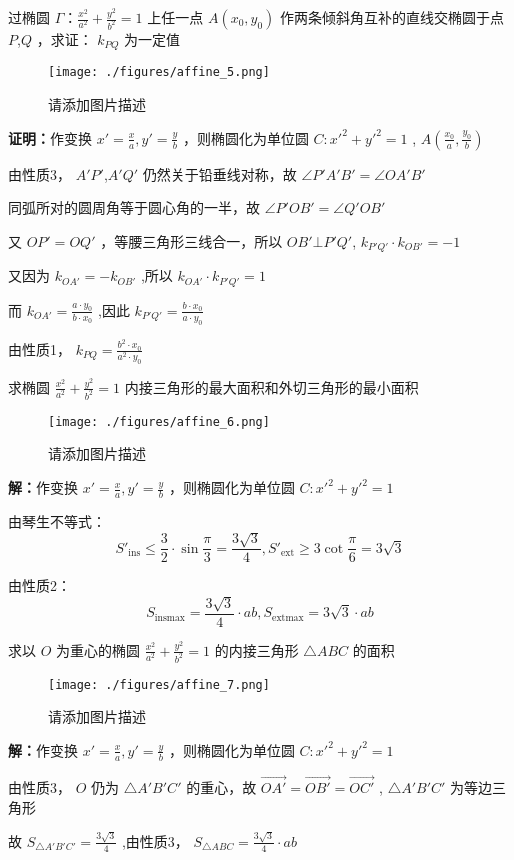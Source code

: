\begin{corollary}{}
过椭圆 \(\Gamma：\frac{x^2}{a^2}+\frac{y^2}{b^2}=1\) 上任一点 \(A(x_0,y_0)\) 作两条倾斜角互补的直线交椭圆于点 \(P\),\(Q\) ，求证： \(k_{PQ}\) 为一定值
\begin{figure}[ht]
\centering
\texttt{[image: ./figures/affine\_5.png]}
\caption{请添加图片描述} \label{affine_fig5}
\end{figure}
\textbf{证明：}作变换 \(x'=\frac{x}{a},y'=\frac{y}{b}\) ，则椭圆化为单位圆 \(C:x'^2+y'^2=1\) , \(A\left(\frac{x_0}{a},\frac{y_0}{b}\right)\) 

由性质3， \(A'P'\),\(A'Q'\) 仍然关于铅垂线对称，故 \(\angle P'A'B'=\angle OA'B'\)

同弧所对的圆周角等于圆心角的一半，故 \(\angle P'OB'=\angle Q'OB'\)

又 \(OP'=OQ'\) ，等腰三角形三线合一，所以 \(OB'\bot P'Q' \), \(k_{P'Q'}\cdot k_{OB'}=-1\)

又因为 \(k_{OA'}=-k_{OB'}\) ,所以 \(k_{OA'}\cdot k_{P'Q'}=1\)

而 \(k_{OA'}=\frac{a\cdot y_0}{b\cdot x_0}\) ,因此 \(k_{P'Q'}=\frac{b\cdot x_0}{a\cdot y_0}\)

由性质1， \(k_{PQ}=\frac{b^2\cdot x_0}{a^2 \cdot y_0}\) 
\end{corollary}
\begin{corollary}{}
求椭圆 \(\frac{x^2}{a^2}+\frac{y^2}{b^2}=1\) 内接三角形的最大面积和外切三角形的最小面积
\begin{figure}[ht]
\centering
\texttt{[image: ./figures/affine\_6.png]}
\caption{请添加图片描述} \label{affine_fig6}
\end{figure}
\textbf{解：}作变换 \(x'=\frac{x}{a},y'=\frac{y}{b}\) ，则椭圆化为单位圆 \(C:x'^2+y'^2=1\)

由琴生不等式：
$$S'_{\text{ins}}\leq \frac{3}{2}\cdot \sin\frac{\pi}{3}=\frac{3\sqrt{3}}{4}, S'_{\text{ext}}\geq 3\cot\frac{\pi}{6}=3\sqrt{3}$$ 

由性质2： 
$$S_{\text{ins}\max}=\frac{3\sqrt{3}}{4}\cdot ab, S_{\text{ext}\max}=3\sqrt{3}\cdot ab$$ 

\end{corollary}
\begin{corollary}{}
求以 \(O\) 为重心的椭圆 \(\frac{x^2}{a^2}+\frac{y^2}{b^2}=1\) 的内接三角形 \(\triangle ABC\) 的面积
\begin{figure}[ht]
\centering
\texttt{[image: ./figures/affine\_7.png]}
\caption{请添加图片描述} \label{affine_fig7}
\end{figure}
\textbf{解：}作变换 \(x'=\frac{x}{a},y'=\frac{y}{b}\) ，则椭圆化为单位圆 \(C:x'^2+y'^2=1\)

由性质3， \(O\) 仍为 \(\triangle A'B'C'\) 的重心，故 \(\vec{OA'}=\vec{OB'}=\vec{OC'}\)  , \(\triangle A'B'C'\) 为等边三角形

故 \(S_{\triangle A'B'C'}=\frac{3\sqrt{3}}{4}\) ,由性质3， \(S_{\triangle ABC}=\frac{3\sqrt{3}}{4}\cdot ab\) 
\end{corollary}
